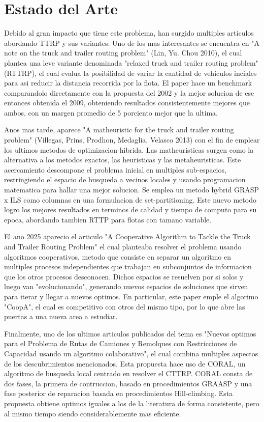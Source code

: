 \documentclass[letter, 10pt]{article}
\begin{document}
\section{Estado del Arte}
Debido al gran impacto que tiene este problema, han surgido multiples articulos abordando TTRP y sus variantes. Uno de los mas interesantes se encuentra
en "A note on the truck and trailer routing problem" (Lin, Yu. Chou 2010), el cual plantea una leve variante denominada "relaxed truck and trailer routing
problem" (RTTRP), el cual evalua la posibilidad de variar la cantidad de vehiculos inciales para asi reducir la distancia recorrida por la flota. El paper
hace un benchmark comparandolo directamente con la propuesta del 2002 y la mejor solucion de ese entonces obtenida el 2009, obteniendo resultados consistentemente
mejores que ambos, con un margen promedio de 5 porciento mejor que la ultima.

Anos mas tarde, aparece "A matheuristic for the truck and trailer routing problem" (Villegas, Prins, Prodhon, Medaglia, Velasco 2013) con el fin de emplear
los ultimos metodos de optimizacion hibrida. Las matheuristicas surgen como la alternativa a los metodos exactos, las heuristicas y las metaheuristicas. Este
acercamiento descompone el problema inicial en multiples sub-espacios, restringiendo el espacio de busqueda a vecinos locales y usando programacion matematica
para hallar una mejor solucion. Se emplea un metodo hybrid GRASP x ILS como columnas en una formulacion de set-partitioning. Este nuevo metodo logro los mejores
resultados en terminos de calidad y tiempo de computo para su epoca, abordando tambien RTTP para flotas con tamano variable.

El ano 2025 aparecio el articulo "A Cooperative Algorithm to Tackle the Truck and Trailer Routing Problem" el cual planteaba resolver el problema usando
algoritmos cooperativos, metodo que consiste en separar un algoritmo en multiples procesos independientes que trabajan en subconjuntos de informacion que
los otros procesos desconocen. Dichos espacios se resuelven por si solos y luego van "evolucionando", generando nuevos espacios de soluciones que sirven
para iterar y llegar a nuevos optimos. En particular, este paper emple el algorimo "CoopA", el cual es competitivo con otros del mismo tipo, por lo que
abre las puertas a una nueva area a estudiar.

Finalmente, uno de los ultimos articulos publicados del tema es "Nuevos optimos para el Problema de Rutas de Camiones y Remolques con Restricciones de Capacidad
usando un algoritmo colaborativo", el cual combina multiples aspectos de los descubrimientos mencionados. Esta propuesta hace uso de CORAL, un algoritmo de busqueda
local centrado en resolver el CTTRP. CORAL consta de dos fases, la primera de contruccion, basado en procedimientos GRAASP y una fase posterior de reparacion basada
en procedimientos Hill-climbing. Esta propuesta obtiene optimos iguales a los de la literatura de forma consistente, pero al mismo tiempo siendo considerablemente
mas eficiente.
\end{document}
